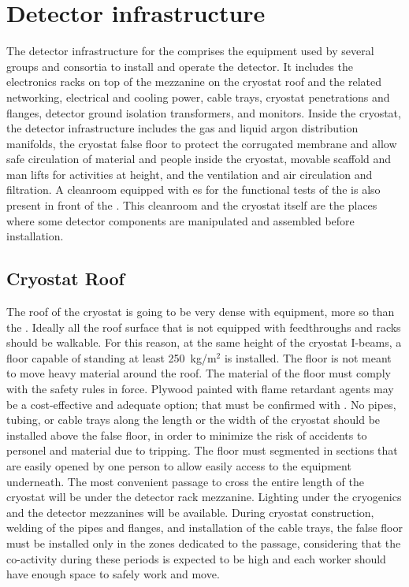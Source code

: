 \section{Detector infrastructure}
\label{ch:dp-tc-infrastructure}

The detector infrastructure for the  comprises the equipment used by several groups and consortia to install and operate the detector.
It includes the electronics racks on top of the mezzanine on the cryostat roof and the related networking, electrical and cooling power, cable trays, cryostat penetrations and flanges, detector ground isolation transformers, and monitors.
Inside the cryostat, the detector infrastructure includes the gas and liquid argon distribution manifolds, the cryostat false floor to protect the corrugated membrane and allow safe circulation of material and people inside the cryostat, movable scaffold and man lifts for activities at height, and the ventilation and air circulation and filtration.
A cleanroom equipped with  \coldbox{}es for the functional tests of the  is also present in front of the .
This cleanroom and the cryostat itself are the places where some detector components are manipulated and assembled before installation.

\subsection{Cryostat Roof}
The roof of the  cryostat is going to be very dense with equipment, more so than the .
Ideally all the roof surface that is not equipped with feedthroughs and racks should be walkable.
For this reason, at the same height of the cryostat I-beams, a floor capable of standing at least 250~kg/m$^2$ is installed.
The floor is not meant to move heavy material around the roof.
The material of the floor must comply with the safety rules in force.
Plywood painted with flame retardant agents may be a cost-effective and adequate option; that must be confirmed with .
No pipes, tubing, or cable trays along the length or the width of the cryostat should be installed above the false floor, in order to minimize the risk of accidents to personel and material due to tripping.
The floor must segmented in sections that are easily opened by one person to allow easily access to the equipment underneath.
The most convenient passage to cross the entire length of the cryostat will be under the detector rack mezzanine.
Lighting under the cryogenics and the detector mezzanines will be available.
During cryostat construction, welding of the pipes and flanges, and installation of the cable trays, the false floor must be installed only in the zones dedicated to the passage, considering that the co-activity during these periods is expected to be high and each worker should have enough space to safely work and move.

